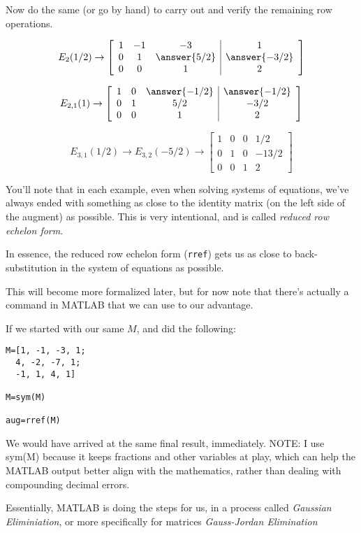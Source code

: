 \documentclass{ximera}
\begin{document}
Now do the same (or go by hand) to carry out and verify the remaining row operations.

$$
E_{2}(1/2)\rightarrow
\left[\begin{array}{ccc|c} 
  1&-1&-3&1\\0&1&\answer{5/2}&\answer{-3/2}\\0&0&1&2
  \end{array}\right]
$$

$$
E_{2,1}(1)\rightarrow
\left[\begin{array}{ccc|c} 
  1&0&\answer{-1/2}&\answer{-1/2}\\0&1&5/2&-3/2\\0&0&1&2
  \end{array}\right]
$$



$$E_{3,1}(1/2)\rightarrow E_{3,2}(-5/2)\rightarrow
\left[\begin{array}{ccc|c} 
  1&0&0&1/2\\0&1&0&-13/2\\0&0&1&2
  \end{array}\right]$$


 
\begin{remark}

  You'll note that in each example, even when solving systems of equations, we've always ended with something as close to the identity matrix (on the left side of the augment) as possible. This is very intentional, and is called \emph{reduced row echelon form}.

  In essence, the reduced row echelon form (\texttt{rref}) gets us as close to back-substitution in the system of equations as possible. 

  This will become more formalized later, but for now note that there's actually a command in MATLAB that we can use to our advantage. 

  If we started with our same $M$, and did the following:

  \begin{verbatim}
M=[1, -1, -3, 1;
  4, -2, -7, 1;
  -1, 1, 4, 1]

M=sym(M)

aug=rref(M)
  \end{verbatim}

  We would have arrived at the same final result, immediately. NOTE: I use sym(M) because it keeps fractions and other variables at play, which can help the MATLAB output better align with the mathematics, rather than dealing with compounding decimal errors. 
  
  Essentially, MATLAB is doing the steps for us, in a process called \emph{Gaussian Eliminiation}, or more specifically for matrices \emph{Gauss-Jordan Elimination}

\end{remark}
\end{document}
